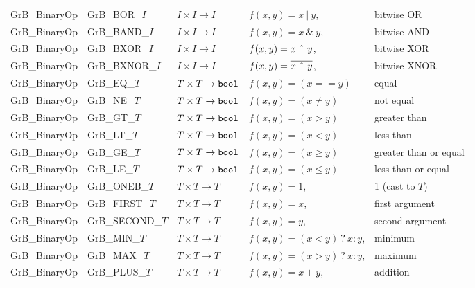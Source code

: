 \begin{table}
\begin{threeparttable}
\begin{tabular}{l|l|l|ll}
{\sf GrB\_BinaryOp}   & {\sf GrB\_BOR\_$I$}   & $I \times I \rightarrow I$ & $f(x,y) = x ~|~ y$, & bitwise OR \\
{\sf GrB\_BinaryOp}   & {\sf GrB\_BAND\_$I$}  & $I \times I \rightarrow I$ & $f(x,y) = x ~\&~ y$, & bitwise AND \\
{\sf GrB\_BinaryOp}   & {\sf GrB\_BXOR\_$I$}  & $I \times I \rightarrow I$ & $f(x,y) = x ~\mbox{\^{}}~ y$, & bitwise XOR \\
{\sf GrB\_BinaryOp}   & {\sf GrB\_BXNOR\_$I$} & $I \times I \rightarrow I$ & $f(x,y) = \overline{x ~\mbox{\^{}}~ y}$, & bitwise XNOR \\

{\sf GrB\_BinaryOp}   & {\sf GrB\_EQ\_$T$}    & $T \times T \rightarrow {\tt bool}$  & $f(x,y) = (x == y)$ & equal \\
{\sf GrB\_BinaryOp}   & {\sf GrB\_NE\_$T$}    & $T \times T \rightarrow {\tt bool}$  & $f(x,y) = (x \neq y)$ & not equal \\
{\sf GrB\_BinaryOp}   & {\sf GrB\_GT\_$T$}    & $T \times T \rightarrow {\tt bool}$  & $f(x,y) = (x > y)$ & greater than  \\
{\sf GrB\_BinaryOp}   & {\sf GrB\_LT\_$T$}    & $T \times T \rightarrow {\tt bool}$  & $f(x,y) = (x < y)$ & less than  \\
{\sf GrB\_BinaryOp}   & {\sf GrB\_GE\_$T$}    & $T \times T \rightarrow {\tt bool}$  & $f(x,y) = (x \geq y)$ & greater than or equal \\
{\sf GrB\_BinaryOp}   & {\sf GrB\_LE\_$T$}    & $T \times T \rightarrow {\tt bool}$  & $f(x,y) = (x \leq y)$ & less than or equal \\
{\sf GrB\_BinaryOp}   & {\sf GrB\_ONEB\_$T$}  & $T \times T \rightarrow T$  & $f(x,y) = 1$, & 1 (cast to $T$) \\
{\sf GrB\_BinaryOp}   & {\sf GrB\_FIRST\_$T$} & $T \times T \rightarrow T$  & $f(x,y) = x$, & first argument \\
{\sf GrB\_BinaryOp}   & {\sf GrB\_SECOND\_$T$}& $T \times T \rightarrow T$  & $f(x,y) = y$, & second argument \\
{\sf GrB\_BinaryOp}   & {\sf GrB\_MIN\_$T$}   & $T \times T \rightarrow T$  & $f(x,y) = (x < y)~?~x : y$, & minimum \\
{\sf GrB\_BinaryOp}   & {\sf GrB\_MAX\_$T$}   & $T \times T \rightarrow T$  & $f(x,y) = (x > y)~?~x : y$, & maximum \\
{\sf GrB\_BinaryOp}   & {\sf GrB\_PLUS\_$T$}  & $T \times T \rightarrow T$  & $f(x,y) = x + y$, & addition \\

\end{tabular}
\end{threeparttable}
\end{table}

